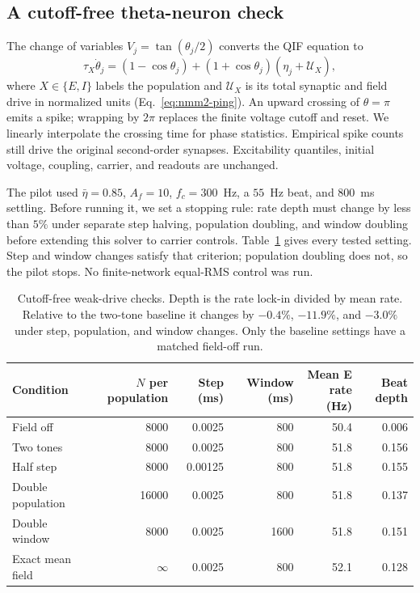 \subsection{A cutoff-free theta-neuron check}\label{supp:theta-pilot}
The change of variables $V_j=\tan(\theta_j/2)$ converts the QIF equation to
\[
\tau_X\dot\theta_j=(1-\cos\theta_j)
 +(1+\cos\theta_j)(\eta_j+\mathcal U_X),
\]
where $X\in\{E,I\}$ labels the population and $\mathcal U_X$ is its total
synaptic and field drive in normalized units (Eq.~\eqref{eq:nmm2-ping}).
An upward crossing of $\theta=\pi$ emits a spike; wrapping by $2\pi$ replaces
the finite voltage cutoff and reset. We linearly interpolate the crossing
time for phase statistics. Empirical spike counts still drive the original
second-order synapses. Excitability quantiles, initial voltage, coupling,
carrier, and readouts are unchanged.

The pilot used $\bar\eta=0.85$, $A_f=10$, $f_c=300$~Hz, a $55$~Hz beat,
and $800$~ms settling. Before running it, we set a stopping rule: rate depth
must change by less than $5\%$ under separate step halving, population
doubling, and window doubling before extending this solver to carrier controls.
Table~\ref{tab:theta-pilot} gives every tested setting. Step and window changes
satisfy that criterion; population doubling does not, so the pilot stops.
No finite-network equal-RMS control was run.

\begin{table}[htbp]
\centering\small
\begin{tabular}{@{}lrrrrr@{}}
\toprule
Condition & \shortstack{$N$ per\\population} & Step (ms) & Window (ms) & \shortstack{Mean E rate\\(Hz)} & Beat depth\\
\midrule
Field off & 8000 & 0.0025 & 800 & 50.4 & 0.006\\
Two tones & 8000 & 0.0025 & 800 & 51.8 & 0.156\\
Half step & 8000 & 0.00125 & 800 & 51.8 & 0.155\\
Double population & 16000 & 0.0025 & 800 & 51.8 & 0.137\\
Double window & 8000 & 0.0025 & 1600 & 51.8 & 0.151\\
Exact mean field & $\infty$ & 0.0025 & 800 & 52.1 & 0.128\\
\bottomrule
\end{tabular}
\caption{Cutoff-free weak-drive checks. Depth is the rate lock-in divided by
mean rate. Relative to the two-tone baseline it changes by $-0.4\%$,
$-11.9\%$, and $-3.0\%$ under step, population, and window changes.
Only the baseline settings have a matched field-off run.}
\label{tab:theta-pilot}
\end{table}

